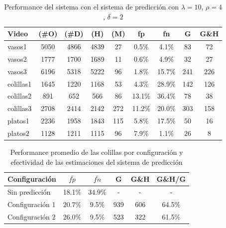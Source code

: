 \begin{table}[htb]
  \begin{tabular}{|l | c | c | c | c | c | c | c | c |}
	\hline  
	\textbf{Video} & \textbf{(\#O)} &  \textbf{(\#D)} & \textbf{(H)} & \textbf{(M)} & \textbf{fp} & \textbf{fn} & \textbf{G} & \textbf{G\&H} \\
	\hline
	\hline
	vasos1 & 5050 & 4866 & 4839 & 27 & 0.5\% & 4.1\%  & 83 & 72\\
	vasos2 & 1777 & 1700 & 1689 & 11 & 0.6\% & 4.9\% & 32 & 27 \\
	vasos3 & 6196 & 5318 & 5222 & 96 & 1.8\% & 15.7\% & 241 & 226 \\
	\hline
	colillas1 & 1645 & 1220 & 1168 & 53 & 4.3\% & 28.9\% & 142 & 126 \\
	colillas2 & 891 & 652 & 566 & 86 & 13.1\% & 36.4\% & 78 & 38 \\
	colillas3 & 2708 & 2414 & 2142 & 272 & 11.2\% & 20.0\% & 303 & 158 \\
	\hline
	platos1 & 2236 & 1958 & 1843 & 115 & 5.8\% & 17.5\% & 50 & 16 \\
	platos2 & 1128 & 1211 & 1115 & 96 & 7.9\% & 1.1\% & 26 & 8 \\
	\hline
	\end{tabular}
	\caption{\label{tab:pred_2} Performance del sistema con el sistema de predicción con
	$\lambda=10$, $\rho=4$, $\delta=2$}
\end{table}

\begin{table}[h]
  \begin{tabular}{|l | c | c | c | c | c|}
	\hline  
	\textbf{Configuración} & \textbf{$\bar{fp}$} &  
	\textbf{$\bar{fn}$}& \textbf{G} &  \textbf{G\&H} &  \textbf{G\&H/G} \\
	\hline
	\hline
	Sin predicción  & 18.1\% & 34.9\% & - & - & - \\
	\hline
	Configuración 1 & 20.7\% & 9.5\% & 939 & 606 & 64.5\%  \\
	\hline
	Configuración 2 & 26.0\% & 9.5\% & 523 & 322 & 61.5\% \\
	\hline
	\end{tabular}
	\caption{\label{tab:evo_colillas} Performance promedio de las colillas 
	por configuración y  efectividad de las estimaciones del sistema de predicción}
\end{table}

